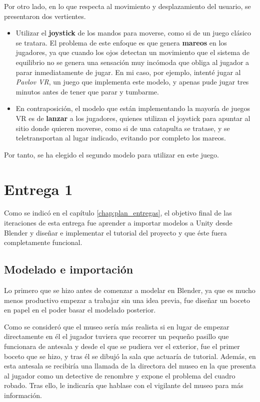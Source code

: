Por otro lado, en lo que respecta al movimiento y desplazamiento del usuario, se presentaron dos vertientes.

\begin{itemize}
    \item Utilizar el \textbf{joystick} de los mandos para moverse, como si de un juego clásico se tratara. El problema de este enfoque es que genera \textbf{mareos} en los jugadores, ya que cuando los ojos detectan un movimiento que el sistema de equilibrio no se genera una sensación muy incómoda que obliga al jugador a parar inmediatamente de jugar. En mi caso, por ejemplo, intenté jugar al \textit{Pavlov VR}, un juego que implementa este modelo, y apenas pude jugar tres minutos antes de tener que parar y tumbarme.
    
    \item En contraposición, el modelo que están implementando la mayoría de juegos \acs{VR} es de \textbf{lanzar} a los jugadores, quienes utilizan el joystick para apuntar al sitio donde quieren moverse, como si de una catapulta se tratase, y se teletransportan al lugar indicado, evitando por completo los mareos. 
\end{itemize}

Por tanto, se ha elegido el segundo modelo para utilizar en este juego.

\section{Entrega 1}

Como se indicó en el capítulo \ref{chap:plan_entregas}, el objetivo final de las iteraciones de esta entrega fue aprender a importar modelos a Unity desde Blender y diseñar e implementar el tutorial del proyecto y que éste fuera completamente funcional. 

\subsection{Modelado e importación}

Lo primero que se hizo antes de comenzar a modelar en Blender, ya que es mucho menos productivo empezar a trabajar sin una idea previa, fue diseñar un boceto en papel en el poder basar el modelado posterior.

Como se consideró que el museo sería más realista si en lugar de empezar directamente en él el jugador tuviera que recorrer un pequeño pasillo que funcionara de antesala y desde el que se pudiera ver el exterior, fue el primer boceto que se hizo, y tras él se dibujó la sala que actuaría de tutorial. Además, en esta antesala se recibiría una llamada de la directora del museo en la que presenta al jugador como un detective de renombre y expone el problema del cuadro robado. Tras ello, le indicaría que hablase con el vigilante del museo para más información.

